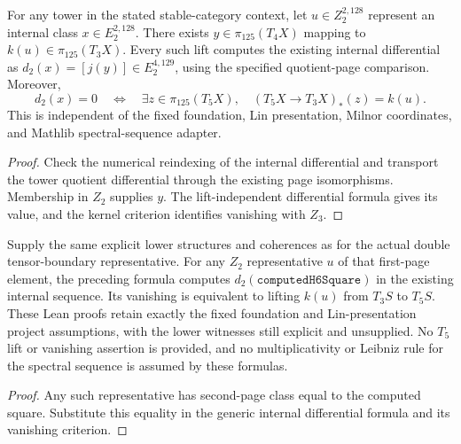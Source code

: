 \begin{proposition}
  \label{prop:h6-internal-second-differential-obstruction}
  \leanok
  For any tower in the stated stable-category context, let $u\in Z_2^{2,128}$
  represent an internal class $x\in E_2^{2,128}$. There exists
  $y\in\pi_{125}(T_4X)$ mapping to $k(u)\in\pi_{125}(T_3X)$.
  Every such lift computes the existing internal differential as
  $d_2(x)=[j(y)]\in E_2^{4,129}$, using the specified quotient-page
  comparison. Moreover,
  \[
    d_2(x)=0\quad\Longleftrightarrow\quad
    \exists z\in\pi_{125}(T_5X),\quad
    (T_5X\longrightarrow T_3X)_*(z)=k(u).
  \]
  This is independent of the fixed foundation, Lin presentation, Milnor
  coordinates, and Mathlib spectral-sequence adapter.
\end{proposition}
\begin{proof}
  Check the numerical reindexing of the internal differential and transport
  the tower quotient differential through the existing page isomorphisms.
  Membership in $Z_2$ supplies $y$. The lift-independent differential formula
  gives its value, and the kernel criterion identifies vanishing with $Z_3$.
  \leanok
\end{proof}

\begin{proposition}
  \label{prop:h6-computed-second-differential-obstruction}
  \notready
  Supply the same explicit lower structures and coherences as for the
  actual double tensor-boundary representative. For any $Z_2$ representative
  $u$ of that first-page element, the preceding formula computes
  $d_2(\texttt{computedH6Square})$ in the existing internal sequence.
  Its vanishing is equivalent to lifting $k(u)$ from $T_3S$ to $T_5S$.
  These Lean proofs retain exactly the fixed foundation and Lin-presentation
  project assumptions, with the lower witnesses still explicit and unsupplied.
  No $T_5$ lift or vanishing assertion is provided, and no multiplicativity
  or Leibniz rule for the spectral sequence is assumed by these formulas.
\end{proposition}
\begin{proof}
  Any such representative has second-page class equal to the computed square.
  Substitute this equality in the generic internal differential formula
  and its vanishing criterion.
\end{proof}

